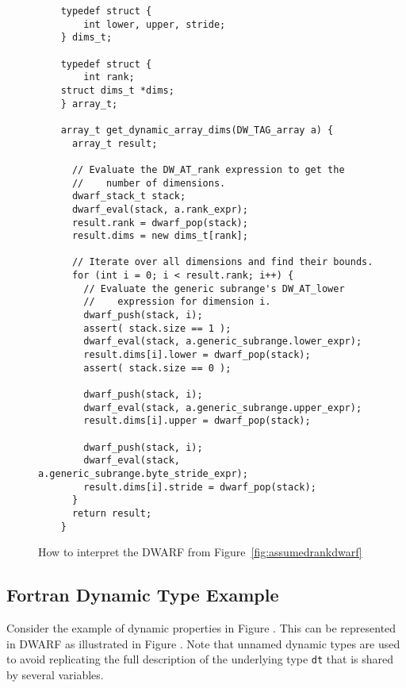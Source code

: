 \begin{figure}[!h]
\begin{lstlisting}
    typedef struct {
        int lower, upper, stride;
    } dims_t;

    typedef struct {
        int rank;
    struct dims_t *dims;
    } array_t;

    array_t get_dynamic_array_dims(DW_TAG_array a) {
      array_t result;

      // Evaluate the DW_AT_rank expression to get the 
      //    number of dimensions.
      dwarf_stack_t stack;
      dwarf_eval(stack, a.rank_expr);
      result.rank = dwarf_pop(stack); 
      result.dims = new dims_t[rank];

      // Iterate over all dimensions and find their bounds.
      for (int i = 0; i < result.rank; i++) {
        // Evaluate the generic subrange's DW_AT_lower 
        //    expression for dimension i.
        dwarf_push(stack, i);
        assert( stack.size == 1 );
        dwarf_eval(stack, a.generic_subrange.lower_expr);
        result.dims[i].lower = dwarf_pop(stack);
        assert( stack.size == 0 );

        dwarf_push(stack, i);
        dwarf_eval(stack, a.generic_subrange.upper_expr);
        result.dims[i].upper = dwarf_pop(stack);
    
        dwarf_push(stack, i);
        dwarf_eval(stack, a.generic_subrange.byte_stride_expr);
        result.dims[i].stride = dwarf_pop(stack);
      }
      return result;
    }
\end{lstlisting}
\caption{How to interpret the DWARF from Figure~\ref{fig:assumedrankdwarf}}
\label{fig:assumedrankdwarfparser}
\end{figure}


\clearpage
\subsection{Fortran Dynamic Type Example}
\label{app:fortrandynamictypeexample}
Consider the  example of dynamic properties in 
Figure .
This can be represented in DWARF as illustrated in 
Figure .
Note that unnamed dynamic types are used to avoid replicating
the full description of the underlying type \texttt{dt} that is shared by
several variables.

